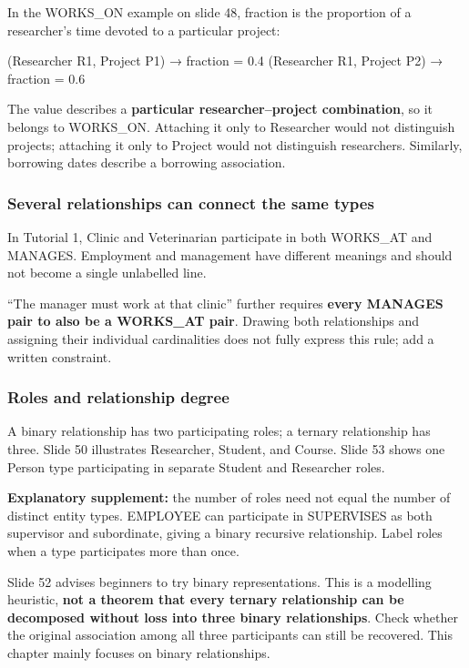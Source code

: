 In the WORKS\_ON example on slide 48, fraction is the proportion of a researcher's time devoted to a particular project:

\begin{StudyCode}
(Researcher R1, Project P1) → fraction = 0.4
(Researcher R1, Project P2) → fraction = 0.6
\end{StudyCode}

The value describes a \textbf{particular researcher--project combination}, so it belongs to WORKS\_ON. Attaching it only to Researcher would not distinguish projects; attaching it only to Project would not distinguish researchers. Similarly, borrowing dates describe a borrowing association.

\subsubsection{Several relationships can connect the same types}\label{02_er_modelling_en-several-relationships-can-connect-the-same-types}

In Tutorial 1, Clinic and Veterinarian participate in both WORKS\_AT and MANAGES. Employment and management have different meanings and should not become a single unlabelled line.

``The manager must work at that clinic'' further requires \textbf{every MANAGES pair to also be a WORKS\_AT pair}. Drawing both relationships and assigning their individual cardinalities does not fully express this rule; add a written constraint.

\subsubsection{Roles and relationship degree}\label{02_er_modelling_en-roles-and-relationship-degree}

A binary relationship has two participating roles; a ternary relationship has three. Slide 50 illustrates Researcher, Student, and Course. Slide 53 shows one Person type participating in separate Student and Researcher roles.

\textbf{Explanatory supplement:} the number of roles need not equal the number of distinct entity types. EMPLOYEE can participate in SUPERVISES as both supervisor and subordinate, giving a binary recursive relationship. Label roles when a type participates more than once.

Slide 52 advises beginners to try binary representations. This is a modelling heuristic, \textbf{not a theorem that every ternary relationship can be decomposed without loss into three binary relationships}. Check whether the original association among all three participants can still be recovered. This chapter mainly focuses on binary relationships.

